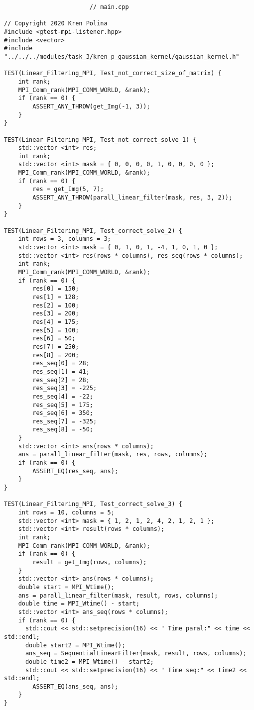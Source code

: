 \documentclass{report}
\begin{document}
\begin{lstlisting}
						// main.cpp

// Copyright 2020 Kren Polina
#include <gtest-mpi-listener.hpp>
#include <vector>
#include "../../../modules/task_3/kren_p_gaussian_kernel/gaussian_kernel.h"

TEST(Linear_Filtering_MPI, Test_not_correct_size_of_matrix) {
    int rank;
    MPI_Comm_rank(MPI_COMM_WORLD, &rank);
    if (rank == 0) {
        ASSERT_ANY_THROW(get_Img(-1, 3));
    }
}

TEST(Linear_Filtering_MPI, Test_not_correct_solve_1) {
    std::vector <int> res;
    int rank;
    std::vector <int> mask = { 0, 0, 0, 0, 1, 0, 0, 0, 0 };
    MPI_Comm_rank(MPI_COMM_WORLD, &rank);
    if (rank == 0) {
        res = get_Img(5, 7);
        ASSERT_ANY_THROW(parall_linear_filter(mask, res, 3, 2));
    }
}

TEST(Linear_Filtering_MPI, Test_correct_solve_2) {
    int rows = 3, columns = 3;
    std::vector <int> mask = { 0, 1, 0, 1, -4, 1, 0, 1, 0 };
    std::vector <int> res(rows * columns), res_seq(rows * columns);
    int rank;
    MPI_Comm_rank(MPI_COMM_WORLD, &rank);
    if (rank == 0) {
        res[0] = 150;
        res[1] = 128;
        res[2] = 100;
        res[3] = 200;
        res[4] = 175;
        res[5] = 100;
        res[6] = 50;
        res[7] = 250;
        res[8] = 200;
        res_seq[0] = 28;
        res_seq[1] = 41;
        res_seq[2] = 28;
        res_seq[3] = -225;
        res_seq[4] = -22;
        res_seq[5] = 175;
        res_seq[6] = 350;
        res_seq[7] = -325;
        res_seq[8] = -50;
    }
    std::vector <int> ans(rows * columns);
    ans = parall_linear_filter(mask, res, rows, columns);
    if (rank == 0) {
        ASSERT_EQ(res_seq, ans);
    }
}

TEST(Linear_Filtering_MPI, Test_correct_solve_3) {
    int rows = 10, columns = 5;
    std::vector <int> mask = { 1, 2, 1, 2, 4, 2, 1, 2, 1 };
    std::vector <int> result(rows * columns);
    int rank;
    MPI_Comm_rank(MPI_COMM_WORLD, &rank);
    if (rank == 0) {
        result = get_Img(rows, columns);
    }
    std::vector <int> ans(rows * columns);
    double start = MPI_Wtime();
    ans = parall_linear_filter(mask, result, rows, columns);
    double time = MPI_Wtime() - start;
    std::vector <int> ans_seq(rows * columns);
    if (rank == 0) {
      std::cout << std::setprecision(16) << " Time paral:" << time << std::endl;
      double start2 = MPI_Wtime();
      ans_seq = SequentialLinearFilter(mask, result, rows, columns);
      double time2 = MPI_Wtime() - start2;
      std::cout << std::setprecision(16) << " Time seq:" << time2 << std::endl;
        ASSERT_EQ(ans_seq, ans);
    }
}


\end{lstlisting}
\end{document}
